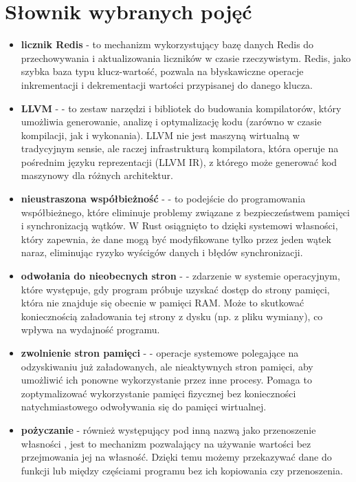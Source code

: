 \newpage
\section{Słownik wybranych pojęć}

\begin{itemize}
    \item \textbf{licznik Redis} - to mechanizm wykorzystujący bazę danych Redis do przechowywania i aktualizowania liczników w czasie rzeczywistym. Redis, jako szybka baza typu klucz-wartość, pozwala na błyskawiczne operacje inkrementacji i dekrementacji wartości przypisanej do danego klucza.

    \item \textbf{LLVM} -  - to zestaw narzędzi i bibliotek do budowania kompilatorów, który umożliwia generowanie, analizę i optymalizację kodu (zarówno w czasie kompilacji, jak i wykonania). LLVM nie jest maszyną wirtualną w tradycyjnym sensie, ale raczej infrastrukturą kompilatora, która operuje na pośrednim języku reprezentacji (LLVM IR), z którego może generować kod maszynowy dla różnych architektur.

    \item \textbf{nieustraszona współbieżność} -  - to podejście do programowania współbieżnego, które eliminuje problemy związane z bezpieczeństwem pamięci i synchronizacją wątków. W Rust osiągnięto to dzięki systemowi własności, który zapewnia, że dane mogą być modyfikowane tylko przez jeden wątek naraz, eliminując ryzyko wyścigów danych i błędów synchronizacji.

    \item \textbf{odwołania do nieobecnych stron} -  - zdarzenie w systemie operacyjnym, które występuje, gdy program próbuje uzyskać dostęp do strony pamięci, która nie znajduje się obecnie w pamięci RAM. Może to skutkować koniecznością załadowania tej strony z dysku (np. z pliku wymiany), co wpływa na wydajność programu.

    \item \textbf{zwolnienie stron pamięci} -  - operacje systemowe polegające na odzyskiwaniu już załadowanych, ale nieaktywnych stron pamięci, aby umożliwić ich ponowne wykorzystanie przez inne procesy. Pomaga to zoptymalizować wykorzystanie pamięci fizycznej bez konieczności natychmiastowego odwoływania się do pamięci wirtualnej.

    \item \textbf{pożyczanie}  - również występujący pod inną nazwą jako przenoszenie własności \cite{rustPolishNames}, jest to mechanizm pozwalający na używanie wartości bez przejmowania jej na własność. Dzięki temu możemy przekazywać dane do funkcji lub między częściami programu bez ich kopiowania czy przenoszenia.


\end{itemize}
